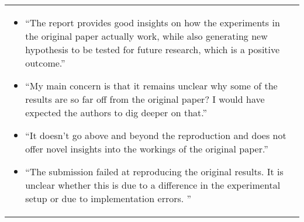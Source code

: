 \begin{table}[h]
\begin{tabular}{@{}l@{}}
\begin{minipage}[t]{\columnwidth}
\begin{itemize}[leftmargin=*]
\item ``The report provides good insights on how the experiments in the original paper actually work, while also generating new hypothesis to be tested for future research, which is a positive outcome.''
\item ``My main concern is that it remains unclear why some of the results are so far off from the original paper? I would have expected the authors to dig deeper on that.''
\item ``It doesn't go above and beyond the reproduction and does not offer novel insights into the workings of the original paper.''
\item ``The submission failed at reproducing the original results. It is unclear whether this is due to a difference in the experimental setup or due to implementation errors. ''
\end{itemize}
\end{minipage}
\end{tabular}
\label{tab:feedback}
\end{table}